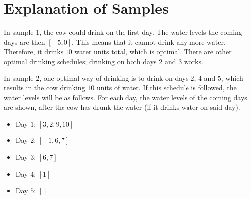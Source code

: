 \section*{Explanation of Samples}
In sample $1$, the cow could drink on the first day. The water levels the coming days are then
$[-5,0]$. This means that it cannot drink any more water. Therefore, it drinks $10$ water units total, which is optimal.
There are other optimal drinking schedules; drinking on both days $2$ and $3$ works.

In sample $2$, one optimal way of drinking is to drink on days $2$, $4$ and $5$, which results in the cow drinking $10$ units of water. 
If this schedule is followed, the water levels will be as follows. For each day, the water levels of the coming days are shown, after the cow has drunk the
water (if it drinks water on said day).
\begin{itemize}
  \item Day $1$: $[3,2,9,10]$
  \item Day $2$: $[-1,6,7]$
  \item Day $3$: $[6,7]$
  \item Day $4$: $[1]$
  \item Day $5$: $[]$
\end{itemize}
